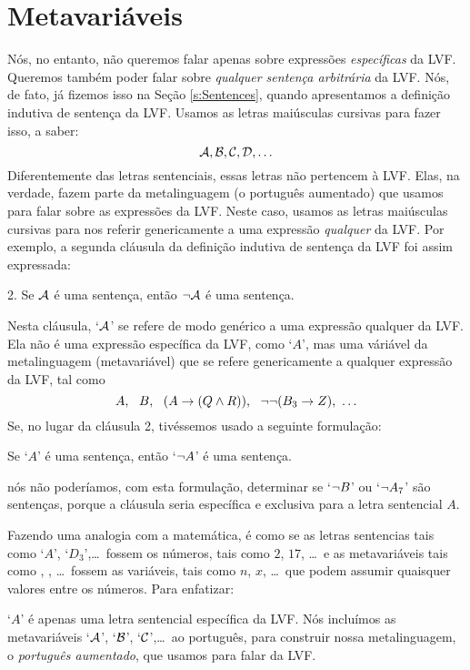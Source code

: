\section{Metavariáveis}\label{s:Metavariables}
Nós, no entanto, não queremos falar apenas sobre expressões \emph{específicas} da LVF. 
Queremos também poder falar sobre \emph{qualquer sentença arbitrária} da LVF.
Nós, de fato, já fizemos isso na Seção \ref{s:Sentences}, quando apresentamos a definição indutiva de sentença da LVF.
Usamos as letras maiúsculas cursivas para fazer isso, a saber:
	$$\mathcal{A}, \mathcal{B}, \mathcal{C}, \mathcal{D}, \ldots$$
Diferentemente das letras sentenciais, essas letras não pertencem à LVF.
Elas, na verdade, fazem parte da metalinguagem (o português aumentado) que usamos para falar sobre as expressões da LVF.
Neste caso, usamos as letras maiúsculas cursivas para nos referir genericamente a uma expressão \emph{qualquer} da LVF.
Por exemplo, a segunda cláusula da definição indutiva de sentença da LVF foi assim expressada:
	\begin{earg}
		\item[2.] Se $\mathcal{A}$ é uma sentença, então $\neg \mathcal{A}$ é uma sentença.
	\end{earg}
Nesta cláusula, `$\mathcal{A}$' se refere de modo genérico a uma expressão qualquer da LVF.
Ela não é uma expressão específica da LVF, como `$A$', mas uma váriável da metalinguagem (metavariável) que se refere genericamente a qualquer expressão da LVF, tal como $$A,\ \ B,\ \  (A \eif (Q \eand R)),\ \  \enot\enot(B_3 \eif Z),\ \ldots$$
Se, no lugar da cláusula 2, tivéssemos usado a seguinte formulação:
	\begin{ebullet}
		\item Se `$A$' é uma sentença, então `$\neg A$' é uma sentença.
	\end{ebullet}
nós não poderíamos, com esta formulação, determinar se `$\neg B$' ou `$\neg A_7$' são sentenças, porque a cláusula seria específica e exclusiva para a letra sentencial $A$.

Fazendo uma analogia com a matemática, é como se as letras sentencias tais como `$A$', `$D_3$',\ldots\ fossem os números, tais como $2$, $17$, \ldots\ e as metavariáveis tais como , , \ldots\ fossem as variáveis, tais como $n$, $x$, \ldots\ que podem assumir quaisquer valores entre os números.
Para enfatizar:

`$A$' é apenas uma letra sentencial específica da LVF.
Nós incluímos as metavariáveis `$\mathcal{A}$', `$\mathcal{B}$', `$\mathcal{C}$',\ldots\ ao português, para construir nossa metalinguagem, o \emph{português aumentado}, que usamos para falar da LVF.

